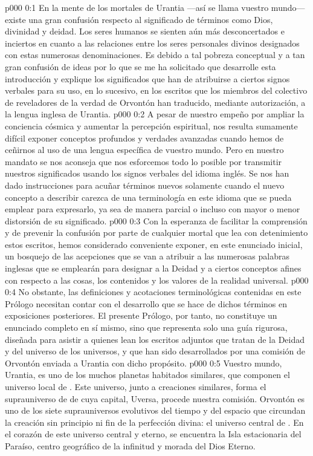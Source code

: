 \author{Consejero divino}
\vs p000 0:1 En la mente de los mortales de Urantia ---así se llama vuestro mundo--- existe una gran confusión respecto al significado de términos como Dios, divinidad y deidad. Los seres humanos se sienten aún más desconcertados e inciertos en cuanto a las relaciones entre los seres personales divinos designados con estas numerosas denominaciones. Es debido a tal pobreza conceptual y a tan gran confusión de ideas por lo que se me ha solicitado que desarrolle esta introducción y explique los significados que han de atribuirse a ciertos signos verbales para su uso, en lo sucesivo, en los escritos que los miembros del colectivo de reveladores de la verdad de Orvontón han traducido, mediante autorización, a la lengua inglesa de Urantia.
\vs p000 0:2 A pesar de nuestro empeño por ampliar la conciencia cósmica y aumentar la percepción espiritual, nos resulta sumamente difícil exponer conceptos profundos y verdades avanzadas cuando hemos de ceñirnos al uso de una lengua específica de vuestro mundo. Pero en nuestro mandato se nos aconseja que nos esforcemos todo lo posible por transmitir nuestros significados usando los signos verbales del idioma inglés. Se nos han dado instrucciones para acuñar términos nuevos solamente cuando el nuevo concepto a describir carezca de una terminología en este idioma que se pueda emplear para expresarlo, ya sea de manera parcial o incluso con mayor o menor distorsión de su significado.
\vs p000 0:3 Con la esperanza de facilitar la comprensión y de prevenir la confusión por parte de cualquier mortal que lea con detenimiento estos escritos, hemos considerado conveniente exponer, en este enunciado inicial, un bosquejo de las acepciones que se van a atribuir a las numerosas palabras inglesas que se emplearán para designar a la Deidad y a ciertos conceptos afines con respecto a las cosas, los contenidos y los valores de la realidad universal.
\vs p000 0:4 No obstante, las definiciones y acotaciones terminológicas contenidas en este Prólogo necesitan contar con el desarrollo que se hace de dichos términos en exposiciones posteriores. El presente Prólogo, por tanto, no constituye un enunciado completo en sí mismo, sino que representa solo una guía rigurosa, diseñada para asistir a quienes lean los escritos adjuntos que tratan de la Deidad y del universo de los universos, y que han sido desarrollados por una comisión de Orvontón enviada a Urantia con dicho propósito.
\vs p000 0:5 \pc Vuestro mundo, Urantia, es uno de los muchos planetas habitados similares, que componen el universo local de . Este universo, junto a creaciones similares, forma el suprauniverso de  de cuya capital, Uversa, procede nuestra comisión. Orvontón es uno de los siete suprauniversos evolutivos del tiempo y del espacio que circundan la creación sin principio ni fin de la perfección divina: el universo central de . En el corazón de este universo central y eterno, se encuentra la Isla estacionaria del Paraíso, centro geográfico de la infinitud y morada del Dios Eterno.
